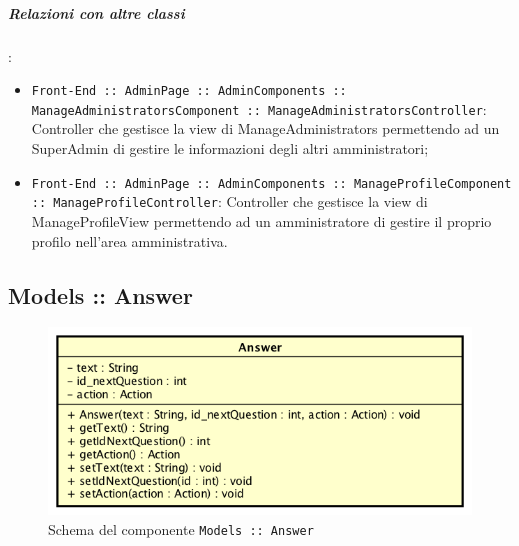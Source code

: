 \documentclass[../ManualeSviluppatore_v1.0.0.tex]{subfiles}
\begin{document}
		\subparagraph{Relazioni con altre classi}:
		      \begin{itemize}
		      	\item \texttt{Front-End :: AdminPage :: AdminComponents :: ManageAdministratorsComponent :: ManageAdministratorsController}: Controller che gestisce la view di ManageAdministrators permettendo ad un SuperAdmin di gestire le informazioni degli altri amministratori;
		      	\item \texttt{Front-End :: AdminPage :: AdminComponents :: ManageProfileComponent :: ManageProfileController}: Controller che gestisce la view di ManageProfileView permettendo ad un amministratore di gestire il proprio profilo nell'area amministrativa.
		      \end{itemize}

	\newpage
	\subsection{Models :: Answer}
	\begin{figure}[!h]
		\centering
		\includegraphics[scale=0.6]{Architettura/Front-End/Models/Answer.png}
		\caption{Schema del componente \texttt{Models :: Answer}}
	\end{figure}
\end{document}
